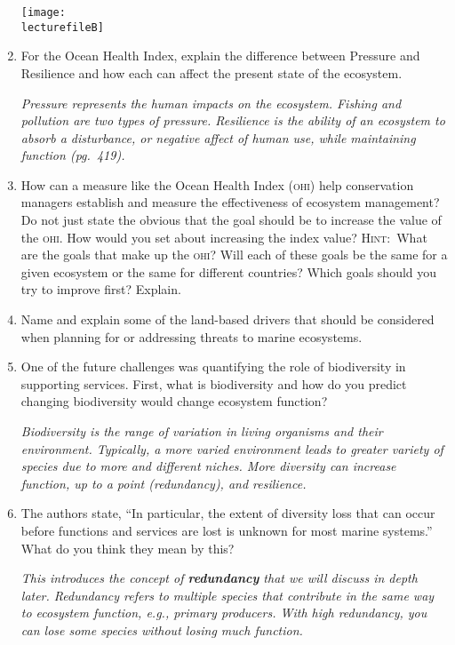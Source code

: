 \documentclass[letterpaper]{tufte-handout}
\newcommand\lecturefileB{434_lecture02_instructor}
\begin{document}
\begin{enumerate}
	\begin{marginfigure}
	\texttt{[image: \\lecturefileB]}
	\end{marginfigure}
	
	\item For the Ocean Health Index, explain the difference between Pressure and
	Resilience and how each can affect the present state of the ecosystem.
	
	\textit{Pressure represents the human impacts on the ecosystem. Fishing and pollution are two types of pressure. Resilience is the ability of an ecosystem to absorb a disturbance, or negative affect of human use, while maintaining function (pg.~419).}
	
	\item How can a measure like the Ocean Health Index (\textsc{ohi}) help 
	conservation managers establish and measure
	the effectiveness of ecosystem management? Do not just state the obvious that 
	the goal should be to increase the value of the \textsc{ohi}. How would
	you set about increasing the index value? \textsc{Hint:}~What are the goals
	that make up the \textsc{ohi}? Will each of these goals be the same for
	a given ecosystem or the same for different countries? Which goals should
	you try to improve first? Explain.
	
	\item Name and explain some of the land-based drivers that should be considered
	when planning for or addressing threats to marine ecosystems.
	
	\item One of the future challenges was quantifying the role of biodiversity in supporting services. First, what is biodiversity and how do you predict changing biodiversity would change ecosystem function?
	
	\textit{Biodiversity is the range of variation in living organisms and their environment. Typically, a more varied environment leads to greater variety of species due to more and different niches. More diversity can increase function, up to a point (redundancy), and resilience.}
	
	\item The authors state, “In particular, the extent of diversity loss that can occur before functions and services are lost is unknown for most marine systems.” What do you think they mean by this?
	
	\textit{This introduces the concept of \textbf{redundancy} that we will discuss in depth later. Redundancy refers to multiple species that contribute in the same way to ecosystem function, e.g., primary producers. With high redundancy, you can lose some species without losing much function.}
	
\end{enumerate}
\end{document}
